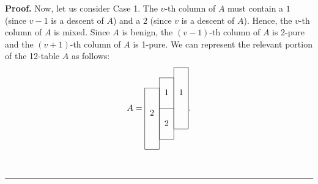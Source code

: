 \documentclass[numbers=enddot,12pt,final,onecolumn,notitlepage]{scrartcl}%
\theoremstyle{definition}
\newenvironment{proof}[1][Proof]{\noindent\textbf{#1.} }{\ \rule{0.5em}{0.5em}}
\begin{document}
\begin{proof}
Now, let us consider Case 1.
The $v$-th column of $A$ must contain a $1$ (since $v-1$ is a descent of $A$)
and a $2$ (since $v$ is a descent of $A$). Hence, the $v$-th column of $A$ is
mixed. Since $A$ is benign, the $\left(  v-1\right)  $-th column of $A$ is
2-pure and the
$\left(  v+1\right)  $-th column of $A$ is 1-pure. We can represent the relevant portion of the 12-table $A$ as follows:%
\begin{equation}
A=%
\begin{tabular}{ccc}
\cline{3-3} & & \multicolumn{1}{|c|}{} \\
\cline{2-2} & \multicolumn{1}{|c|}{} & \multicolumn{1}{|c|}{} \\
\cline{1-1} \multicolumn{1}{|c|}{} & \multicolumn{1}{|c|}{1} & \multicolumn
{1}{|c|}{1} \\
\multicolumn{1}{|c|}{} & \multicolumn{1}{|c|}{} & \multicolumn{1}{|c|}{} \\
\cline{2-2} \multicolumn{1}{|c|}{2} & \multicolumn{1}{|c|}{} & \multicolumn
{1}{|c|}{} \\
\multicolumn{1}{|c|}{} & \multicolumn{1}{|c|}{2} & \multicolumn{1}{|c|}{} \\
\cline{3-3} \multicolumn{1}{|c|}{} & \multicolumn{1}{|c|}{} \\
\cline{2-2} \multicolumn{1}{|c|}{} \\
\cline{1-1}
\end{tabular}%
. \label{pf.prop.descent-resolution.hyps.short.A}%
\end{equation}


\end{proof}
\end{document}
